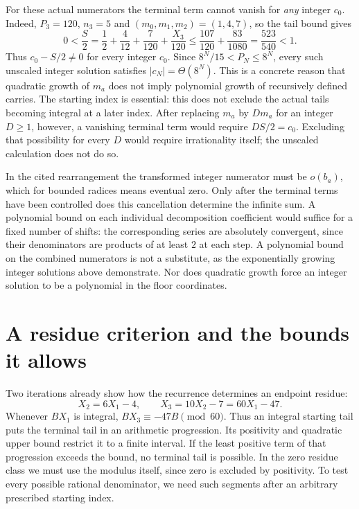 \documentclass[11pt]{article}
\theoremstyle{remark}
\theoremstyle{plain}
\begin{document}
For these actual numerators the terminal term cannot vanish for
\emph{any} integer $c_0$.  Indeed, $P_3=120$, $n_3=5$ and
$(m_0,m_1,m_2)=(1,4,7)$, so the tail bound gives
\[
 0<\frac S2
 =\frac12+\frac4{12}+\frac7{120}+\frac{X_3}{120}
 \le\frac{107}{120}+\frac{83}{1080}
 =\frac{523}{540}<1.
\]
Thus $c_0-S/2\ne0$ for every integer $c_0$.  Since
$8^N/15<P_N\le8^N$, every such unscaled integer solution satisfies
$|c_N|=\Theta(8^N)$.  This is a concrete reason that quadratic growth of
$m_a$ does not imply polynomial growth of recursively defined carries.
The starting index is essential: this does not exclude the actual tails
becoming integral at a later index.  After replacing $m_a$ by $D m_a$ for an integer $D\ge1$, however, a
vanishing terminal term would require $DS/2=c_0$.  Excluding that
possibility for every $D$ would require irrationality itself; the
unscaled calculation does not do so.

In the cited rearrangement the transformed integer numerator must be
$o(b_a)$, which for bounded radices means eventual zero.  Only after the
terminal terms have been controlled does this cancellation determine the
infinite sum.  A polynomial bound on each individual decomposition
coefficient would suffice for a fixed number of shifts: the corresponding
series are absolutely convergent, since their denominators are products
of at least $2$ at each step.  A polynomial bound on the combined
numerators is not a substitute, as the exponentially growing integer solutions above demonstrate.  Nor does quadratic growth force an integer solution to be a polynomial in the floor coordinates.

\section{A residue criterion and the bounds it allows}\label{long269:sec:escape}

Two iterations already show how the recurrence determines an endpoint
residue:
\[
 X_2=6X_1-4,\qquad X_3=10X_2-7=60X_1-47.
\]
Whenever $BX_1$ is integral, $BX_3\equiv-47B\pmod{60}$.
Thus an integral starting tail puts the terminal tail in an arithmetic
progression. Its positivity and quadratic upper bound restrict it to a
finite interval. If the least positive term of that progression exceeds
the bound, no terminal tail is possible. In the zero residue class we
must use the modulus itself, since zero is excluded by positivity.
To test every possible rational denominator, we need such segments after
an arbitrary prescribed starting index.
\end{document}
